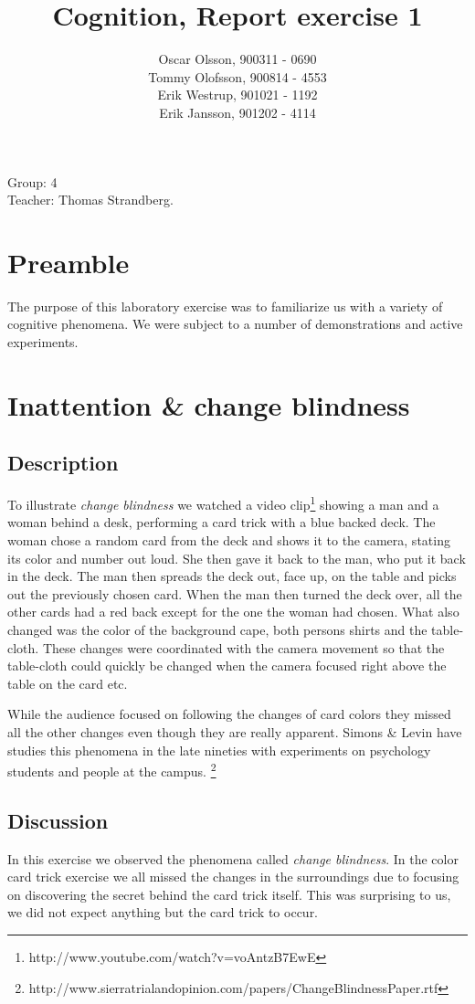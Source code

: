 \documentclass[10pt, a4paper]{article}
\title{Cognition, Report exercise 1}
\date{}
\author{Oscar Olsson, 900311 - 0690\\ Tommy Olofsson, 900814 - 4553\\
	Erik Westrup, 901021 - 1192\\ Erik Jansson, 901202 - 4114}
\begin{document}
\maketitle
\begin{center}
Group: 4 \\
Teacher: Thomas Strandberg.
\end{center}
\newpage

\section{Preamble}
The purpose of this laboratory exercise was to familiarize us with a variety of cognitive phenomena. We were subject to a number of demonstrations and active experiments.

\section{Inattention \& change blindness}
\subsection{Description}
To illustrate \emph{change blindness} we watched a video clip\footnote{http://www.youtube.com/watch?v=voAntzB7EwE} showing a man and a woman behind a desk, performing a card trick with a blue backed deck. The woman chose a random card from the deck and shows it to the camera, stating its color and number out loud. She then gave it back to the man, who put it back in the deck. The man then spreads the deck out, face up, on the table and picks out the previously chosen card. When the man then turned the deck over, all the other cards had a red back except for the one the woman had chosen. What also changed was the color of the background cape, both persons shirts and the table-cloth. These changes were coordinated with the camera movement so that the table-cloth could quickly be changed when the camera focused right above the table on the card etc.

While the audience focused on following the changes of card colors they missed all the other changes even though they are really apparent. Simons \& Levin have studies this phenomena in the late nineties with experiments on psychology students and people at the campus. \footnote{http://www.sierratrialandopinion.com/papers/ChangeBlindnessPaper.rtf}

\subsection{Discussion}
In this exercise we observed the phenomena called \emph{change blindness}. In the color card trick exercise we all missed the changes in the surroundings due to focusing on discovering the secret behind the card trick itself. This was surprising to us, we did not expect anything but the card trick to occur. 
\end{document}
